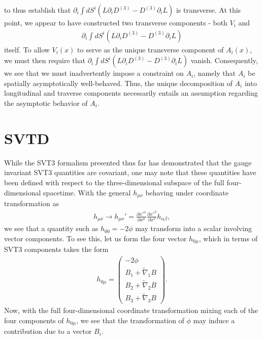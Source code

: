 %
to thus establish that $\partial_i\int dS^i(L\partial_iD^{(3)}-D^{(3)}\partial_iL)$ is transverse. At this point, we appear to have constructed two transverse components - both $V_i$ and 
%
\begin{eqnarray}
\partial_i\int dS^i(L\partial_iD^{(3)}-D^{(3)}\partial_iL)
\end{eqnarray}
%
itself. To allow $V_i(x)$ to serve as the unique transverse component of $A_i(x)$, we must then require that $\partial_i\int dS^i(L\partial_iD^{(3)}-D^{(3)}\partial_iL)$ vanish. Consequently, we see that we must inadvertently impose a constraint on $A_i$, namely that $A_i$ be spatially asymptotically well-behaved. Thus, the unique decomposition of $A_i$ into longitudinal and traverse components necessarily entails an assumption regarding the asymptotic behavior of $A_i$. 

\section{SVTD}
\label{s:svtd}

While the SVT3 formalism presented thus far has demonstrated that the gauge invariant SVT3 quantities are covariant, one may note that these quantities have been defined with respect to the three-dimensional subspace of the full four-dimensional spacetime. With the general $h_{\mu\nu}$ behaving under coordinate transformation as
%
\begin{eqnarray}
h_{\mu\nu} \to h_{\mu\nu}' = \frac{\partial x'^\alpha}{\partial x^\mu}\frac{\partial x'^\beta}{\partial x^\nu} h_{\alpha\beta},
\end{eqnarray}
%
we see that a quantity such as $h_{00} = -2\phi$ may transform into a scalar involving vector components. To see this, let us form the four vector $h_{0\mu}$, which in terms of SVT3 components takes the form
\begin{eqnarray}
h_{0\mu} = \begin{pmatrix}-2\phi\\B_1 + \tilde\nabla_1 B\\B_2 + \tilde\nabla_2 B\\B_3 + \tilde\nabla_3 B\end{pmatrix}.
\end{eqnarray}
Now, with the full four-dimensional coordinate transformation mixing each of the four components of $h_{0\mu}$, we see that the transformation of $\phi$ may induce a contribution due to a vector $B_i$. 

